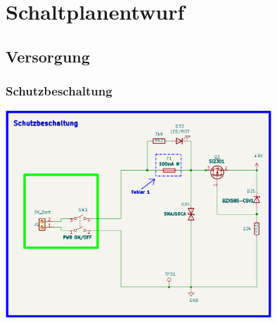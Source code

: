 
\section{Schaltplanentwurf}

\subsection{Versorgung}

\subsubsection{Schutzbeschaltung}

\begin{center}
\includegraphics[width=10cm]{Bilder/Schutzbeschaltung.png}
\end{center}

